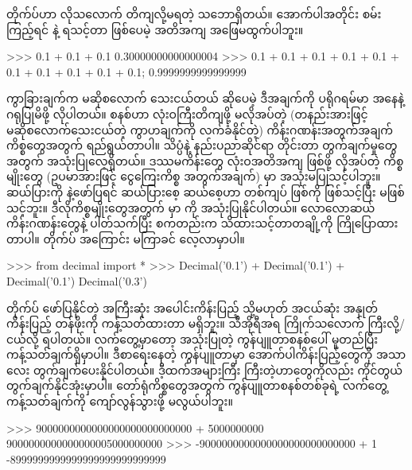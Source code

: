  တိုက်ပ်ဟာ လိုသလောက် တိကျလို့မရတဲ့ သဘောရှိတယ်။ အောက်ပါအတိုင်း စမ်းကြည့်ရင်   နဲ့  ရသင့်တာ ဖြစ်ပေမဲ့ အတိအကျ အဖြေမထွက်ပါဘူး။
%
\setlength{\fboxsep}{0pt}
\begin{codetxt}
>>> 0.1 + 0.1 + 0.1
0.30000000000000004
>>> 0.1 + 0.1 + 0.1 + 0.1 + 0.1 + 0.1 + 0.1 + 0.1 + 0.1 + 0.1;
0.9999999999999999
\end{codetxt}
%
ကွာခြားချက်က မဆိုစလောက် သေးငယ်တယ် ဆိုပေမဲ့ ဒီအချက်ကို ပရိုဂရမ်မာ အနေနဲ့ ဂရုပြုမိဖို့ လိုပါတယ်။    စနစ်ဟာ လုံးဝကြီးတိကျဖို့ မလိုအပ်တဲ့ (တနည်းအားဖြင့် မဆိုစလောက်သေးငယ်တဲ့ ကွာဟချက်ကို လက်ခံနိုင်တဲ့) ကိန်းဂဏန်းအတွက်အချက် ကိစ္စတွေအတွက် ရည်ရွယ်တာပါ။ သိပ္ပံနဲ့ နည်းပညာဆိုင်ရာ တိုင်းတာ တွက်ချက်မှုတွေအတွက် အသုံးပြုလေ့ရှိတယ်။ ဒဿမကိန်းတွေ လုံးဝအတိအကျ ဖြစ်ဖို့ လိုအပ်တဲ့ ကိစ္စမျိုးတွေ (ဥပမာအားဖြင့် ငွေကြေးကိစ္စ အတွက်အချက်) မှာ အသုံးမပြုသင့်ပါဘူး။ ဆယ်ပြားကို  နဲ့ဖော်ပြရင် ဆယ်ပြားစေ့ ဆယ်စေ့ဟာ တစ်ကျပ် ဖြစ်ကို ဖြစ်သင့်ပြီး  မဖြစ်သင့်ဘူး။ ဒီလိုကိစ္စမျိုးတွေအတွက်  မှာ  ကို အသုံးပြုနိုင်ပါတယ်။  လောလောဆယ် ကိန်းဂဏန်းတွေနဲ့ ပါတ်သက်ပြီး စကတည်းက သိထားသင့်တာတချို့ကို ကြိုပြောထားတာပါ။  တိုက်ပ် အကြောင်း မကြာခင် လေ့လာမှာပါ။
%
\setlength{\fboxsep}{0pt}
\begin{codetxt}
>>> from decimal import *
>>> Decimal('0.1') + Decimal('0.1') + Decimal('0.1')
Decimal('0.3')
\end{codetxt}
%

   တိုက်ပ် ဖော်ပြနိုင်တဲ့ အကြီးဆုံး အပေါင်းကိန်းပြည့် သို့မဟုတ် အငယ်ဆုံး အနှုတ်ကိန်းပြည့် တန်ဖိုးကို ကန့်သတ်ထားတာ မရှိဘူး။  သီအိုရီအရ ကြိုက်သလောက် ကြီးလို့/ငယ်လို့ ရပါတယ်။ လက်တွေ့မှာတော့ အသုံးပြုတဲ့ ကွန်ပျူတာစနစ်ပေါ် မူတည်ပြီး ကန့်သတ်ချက်ရှိမှာပါ။ ဒီစာရေးနေတဲ့ ကွန်ပျူတာမှာ အောက်ပါကိန်းပြည့်တွေကို အသာလေး တွက်ချက်ပေးနိုင်ပါတယ်။ ဒီ့ထက်အများကြီး ကြီးတဲ့ဟာတွေကိုလည်း ကိုင်တွယ်တွက်ချက်နိုင်အုံးမှာပါ။ တော်ရုံကိစ္စတွေအတွက် ကွန်ပျူတာစနစ်တစ်ခုရဲ့ လက်တွေ့ကန့်သတ်ချက်ကို ကျော်လွန်သွားဖို့ မလွယ်ပါဘူး။
%
\setlength{\fboxsep}{0pt}
\begin{codetxt}
>>> 9000000000000000000000000000 + 5000000000
9000000000000000005000000000
>>> -9000000000000000000000000000 + 1 
-8999999999999999999999999999
 \end{codetxt}
 

